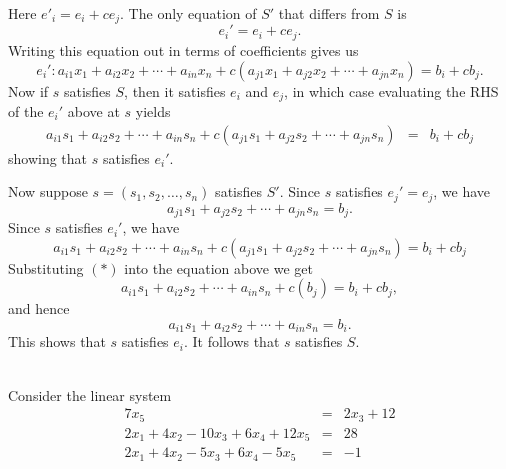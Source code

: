 \begin{solution}
\begin{description}
 Here $e'_i=e_i+ce_j$. The only equation of $S'$ that differs from $S$ is 
\[
e_i'=e_i+ce_j.
\]
Writing this equation out in terms of coefficients gives us
\[
e_i': a_{i1}x_1+a_{i2}x_2+\cdots +a_{in}x_n+c(a_{j1}x_1+a_{j2}x_2+\cdots +a_{jn}x_n)=b_i+cb_j.
\] 
Now if $s$ satisfies $S$, then it satisfies $e_i$ and $e_j$, in which case evaluating the RHS of the $e_i'$ above at $s$ yields 
\begin{eqnarray*}
a_{i1}s_1+a_{i2}s_2+\cdots +a_{in}s_n+c(a_{j1}s_1+a_{j2}s_2+\cdots +a_{jn}s_n)&=&b_i+cb_j
\end{eqnarray*}
showing that $s$ satisfies $e_i'$. 

Now suppose $s=(s_1,s_2,\dots, s_n)$ satisfies $S'$. Since $s$ satisfies $e_j'=e_j$, we have 
 \[
 a_{j1}s_1+a_{j2}s_2+\cdots +a_{jn}s_n=b_j\tag{$*$}.
 \]
Since $s$ satisfies $e_i'$, we have 
\[
a_{i1}s_1+a_{i2}s_2+\cdots +a_{in}s_n+c(a_{j1}s_1+a_{j2}s_2+\cdots +a_{jn}s_n)=b_i+cb_j
\]
Substituting $(*)$ into the equation above we get 
\[
a_{i1}s_1+a_{i2}s_2+\cdots +a_{in}s_n+c(b_j)=b_i+cb_j,
\]
and hence 
\[
a_{i1}s_1+a_{i2}s_2+\cdots +a_{in}s_n=b_i.
\]
This shows that $s$ satisfies $e_i$. It follows that $s$ satisfies $S$.

\end{description}
\end{solution}
\ \\
\ii
\noindent
Consider the linear system
\begin{eqnarray*}
7x_5&=&2x_3+12\\
2x_1+4x_2-10x_3+6x_4+12x_5&=&28\\
2x_1+4x_2-5x_3+6x_4-5x_5&=&-1
\end{eqnarray*}
